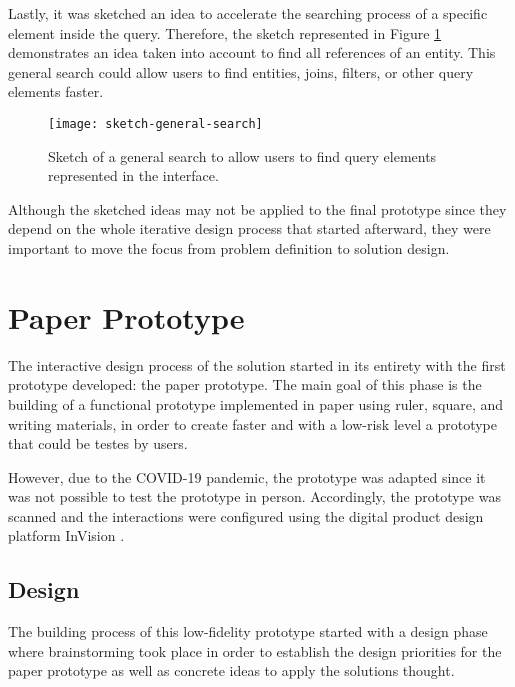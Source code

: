 Lastly, it was sketched an idea to accelerate the searching process of a specific element inside the query. Therefore, the sketch represented in Figure \ref{fig:sketchGeneralSearch} demonstrates an idea taken into account to find all references of an entity. This general search could allow users to find entities, joins, filters, or other query elements faster.

\begin{figure}[htbp]
	\centering
	\texttt{[image: sketch-general-search]}
	\caption{Sketch of a general search to allow users to find query elements represented in the interface.}
	\label{fig:sketchGeneralSearch}
\end{figure}

Although the sketched ideas may not be applied to the final prototype since they depend on the whole iterative design process that started afterward, they were important to move the focus from problem definition to solution design.


\section{Paper Prototype}
\label{sec:paper_prototype}
The interactive design process of the solution started in its entirety with the first prototype developed: the paper prototype. The main goal of this phase is the building of a functional prototype implemented in paper using ruler, square, and writing materials, in order to create faster and with a low-risk level a prototype that could be testes by users.

However, due to the COVID-19 pandemic, the prototype was adapted since it was not possible to test the prototype in person. Accordingly, the prototype was scanned and the interactions were configured using the digital product design platform InVision \cite{invision}.

\subsection{Design}
\label{subsec:paper_prototype_design}
The building process of this low-fidelity prototype started with a design phase where brainstorming took place in order to establish the design priorities for the paper prototype as well as concrete ideas to apply the solutions thought.

\medskip

